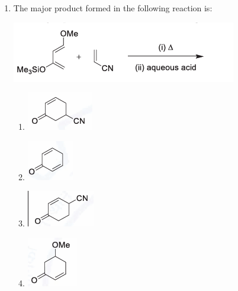 \documentclass[journal,12pt,onecolumn]{IEEEtran}
\begin{document}
\begin{enumerate}
    \item The major product formed in the following reaction is: 
    \begin{center}
    \includegraphics[width=0.8\columnwidth]{figs/q13.png}
    \end{center}
    \begin{multicols}{2}
    \begin{enumerate}
        \item \includegraphics[width=0.4\columnwidth]{figs/q13a.png}
        \item \includegraphics[width=0.4\columnwidth]{figs/q13b.png}
        \item \includegraphics[width=0.4\columnwidth]{figs/q13c.png}
        \item \includegraphics[width=0.4\columnwidth]{figs/q13d.png}
    \end{enumerate}
    \end{multicols}
    \hfill{}


\end{enumerate}
\end{document}
